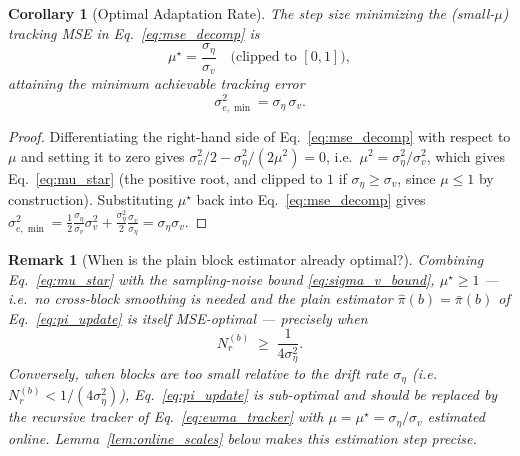 ﻿\documentclass[12pt,a4paper]{article}
\newtheorem{corollary}{Corollary}
\newtheorem{remark}{Remark}
\begin{document}
\begin{corollary}[Optimal Adaptation Rate]
	\label{cor:optimal_mu}
	The step size minimizing the (small-$\mu$) tracking MSE in
	Eq.~\eqref{eq:mse_decomp} is
	\begin{equation}
		\mu^\star = \frac{\sigma_\eta}{\sigma_v} \quad \text{(clipped to $[0,1]$)},
		\label{eq:mu_star}
	\end{equation}
	attaining the minimum achievable tracking error
	\begin{equation}
		\sigma_{e,\min}^2 = \sigma_\eta\,\sigma_v .
		\label{eq:mse_min}
	\end{equation}
\end{corollary}
\begin{proof}
	Differentiating the right-hand side of Eq.~\eqref{eq:mse_decomp} with
	respect to $\mu$ and setting it to zero gives
	$\sigma_v^2/2 - \sigma_\eta^2/(2\mu^2)=0$, i.e.\
	$\mu^2=\sigma_\eta^2/\sigma_v^2$, which gives Eq.~\eqref{eq:mu_star} (the
	positive root, and clipped to $1$ if $\sigma_\eta\geq\sigma_v$, since
	$\mu\le1$ by construction). Substituting $\mu^\star$ back into
	Eq.~\eqref{eq:mse_decomp} gives
	$\sigma_{e,\min}^2 = \frac{1}{2}\frac{\sigma_\eta}{\sigma_v}\sigma_v^2 + \frac{\sigma_\eta^2}{2}\frac{\sigma_v}{\sigma_\eta} = \sigma_\eta\sigma_v$.
\end{proof}

\begin{remark}[When is the plain block estimator already optimal?]
	\label{rem:mu_equals_one}
	Combining Eq.~\eqref{eq:mu_star} with the sampling-noise bound
	\eqref{eq:sigma_v_bound}, $\mu^\star\ge1$ — i.e.\ no cross-block
	smoothing is needed and the plain estimator $\hat\pi(b)=\bar\pi(b)$ of
	Eq.~\eqref{eq:pi_update} is itself MSE-optimal — precisely when
	\begin{equation}
		N_r^{(b)} \;\geq\; \frac{1}{4\sigma_\eta^2}.
		\label{eq:n_condition}
	\end{equation}
	Conversely, when blocks are too small relative to the drift rate
	$\sigma_\eta$ (i.e.\ $N_r^{(b)} < 1/(4\sigma_\eta^2)$), Eq.~\eqref{eq:pi_update}
	is sub-optimal and should be replaced by the recursive tracker of
	Eq.~\eqref{eq:ewma_tracker} with $\mu=\mu^\star=\sigma_\eta/\sigma_v$
	estimated online. Lemma~\ref{lem:online_scales} below makes this
	estimation step precise.
\end{remark}
\end{document}
